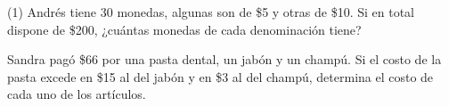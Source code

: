 \documentclass[sin curso]{plantilla-evaluacion-v1}
\begin{document}
\begin{preguntas}(1)
  \pregunta Andrés tiene 30 monedas, algunas son de \$5 y otras de \$10.
  Si en total dispone de \$200, ¿cuántas monedas de cada denominación tiene?
  \begin{malla}[height=7cm]
  \end{malla}
  \begin{respuesta}[height=2cm]
  \end{respuesta}

  \pregunta Sandra pagó \$66 por una pasta dental, un jabón y un champú.
  Si el costo de la pasta excede en \$15 al del jabón y
  en \$3 al del champú, determina el costo de cada uno de los artículos.
  \begin{malla}[height=7cm]
  \end{malla}
  \begin{respuesta}[height=2cm]
  \end{respuesta}

\end{preguntas}
\end{document}
